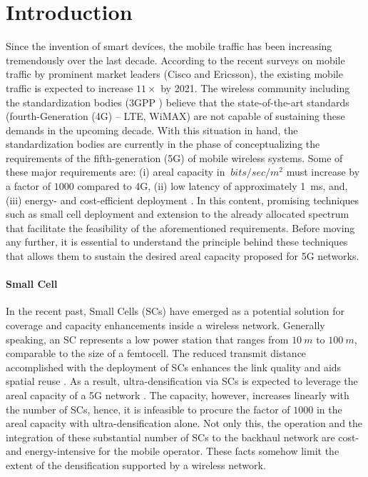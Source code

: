 \chapter{Introduction}

Since the invention of smart devices, the mobile traffic has been increasing tremendously over the last decade. According to the recent surveys on mobile traffic by prominent market leaders (Cisco \cite{CISCO14} and Ericsson\cite{Eric15}), the existing mobile traffic is expected to increase $11 \times$ by 2021. The wireless community including the standardization bodies (3GPP \cite{3GPP}) believe that the state-of-the-art standards (fourth-Generation (4G) -- LTE, WiMAX) are not capable of sustaining these demands in the upcoming decade. With this situation in hand, the standardization bodies are currently in the phase of conceptualizing the requirements of the fifth-generation (5G) of mobile wireless systems.
Some of these major requirements are: (i) areal capacity in $\SI{}{bits/sec/m^2}$ must increase by a factor of $1000$ compared to 4G, (ii) low latency of approximately \SI{1}{ms}, and, (iii) energy- and cost-efficient deployment \cite{Qual13, Andrews14}.
In this content, promising techniques such as small cell deployment and extension to the already allocated spectrum that facilitate the feasibility of the aforementioned requirements. Before moving any further, it is essential to understand the principle behind these techniques that allows them to sustain the desired areal capacity proposed for 5G networks. 

\subsubsection*{Small Cell}

In the recent past, Small Cells (SCs) have emerged as a potential solution for coverage and capacity enhancements inside a wireless network. Generally speaking, an SC represents a low power station that ranges from $\SI{10}{m}$ to $\SI{100}{m}$, comparable to the size of a femtocell. The reduced transmit distance accomplished with the deployment of SCs enhances the link quality and aids spatial reuse \cite{Chander08}.
As a result, ultra-densification via SCs is expected to leverage the areal capacity of a 5G network \cite{Andrews14}. The capacity, however, increases linearly with the number of SCs, hence, it is infeasible to procure the factor of $1000$ in the areal capacity with ultra-densification alone. Not only this, the operation and the integration of these substantial number of SCs to the backhaul network are cost- and energy-intensive for the mobile operator. These facts somehow limit the extent of the densification supported by a wireless network.





